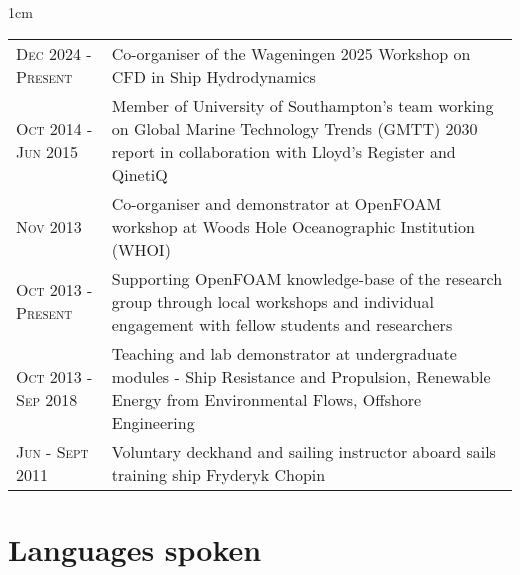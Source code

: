 \documentclass[a4paper,10pt]{article}
\begin{document}
\begin{minipage}{\textwidth}
\begin{adjustwidth}{}{1cm}

{\renewcommand{\arraystretch}{1.2}
\begin{tabular}{l p{13.0cm}}
%
\textsc{Dec 2024 - Present}	& Co-organiser of the Wageningen 2025 Workshop on CFD in Ship Hydrodynamics \\
%
\textsc{Oct 2014 - Jun 2015}	& Member of University of Southampton's team working on
									Global Marine Technology Trends (GMTT) 2030 report
									in collaboration with Lloyd's Register and QinetiQ \\
%
\textsc{Nov 2013}				& Co-organiser and demonstrator at OpenFOAM workshop at Woods Hole Oceanographic Institution (WHOI) \\
%
\textsc{Oct 2013 - Present}		& Supporting OpenFOAM knowledge-base of the research group through
									local workshops and individual engagement with fellow students and researchers \\
%
\textsc{Oct 2013 - Sep 2018}		& Teaching and lab demonstrator at undergraduate modules - Ship Resistance and Propulsion,
									Renewable Energy from Environmental Flows, Offshore Engineering \\
%
%
%
\textsc{Jun - Sept 2011} 		& Voluntary deckhand and sailing instructor aboard sails training ship Fryderyk Chopin \\
%
\end{tabular}
}

\end{adjustwidth}
\end{minipage}


\section{Languages spoken}
\end{document}
